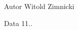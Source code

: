\begin{DoxyAuthor}{Autor}
Witold Zimnicki 
\end{DoxyAuthor}
\begin{DoxyDate}{Data}
11.. 
\end{DoxyDate}
